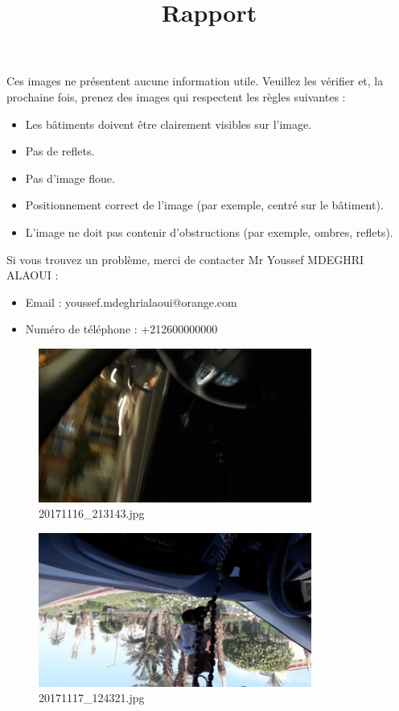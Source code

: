 \documentclass{article}
\begin{document}
    \title{Rapport}
    \maketitle

    Ces images ne pr\'esentent aucune information utile. Veuillez les v\'erifier et, la prochaine fois, prenez des images qui respectent les r\`egles suivantes :
    \begin{itemize}
        \item Les b\^atiments doivent \^etre clairement visibles sur l'image.
        \item Pas de reflets.
        \item Pas d'image floue.
        \item Positionnement correct de l'image (par exemple, centr\'e sur le b\^atiment).
        \item L'image ne doit pas contenir d'obstructions (par exemple, ombres, reflets).
    \end{itemize}

    Si vous trouvez un probl\`eme, merci de contacter Mr Youssef MDEGHRI ALAOUI :
    \begin{itemize}
        \item Email : youssef.mdeghrialaoui@orange.com
        \item Num\'ero de t\'el\'ephone : +212600000000
    \end{itemize}
    
                \begin{figure}[h!]
                \centering
                \includegraphics[width=0.8\textwidth, keepaspectratio]{images/20171116_213143.jpg}
                \caption{20171116_213143.jpg}
                \end{figure}
                
                \begin{figure}[h!]
                \centering
                \includegraphics[width=0.8\textwidth, keepaspectratio]{images/20171117_124321.jpg}
                \caption{20171117_124321.jpg}
                \end{figure}
                
\end{document}
